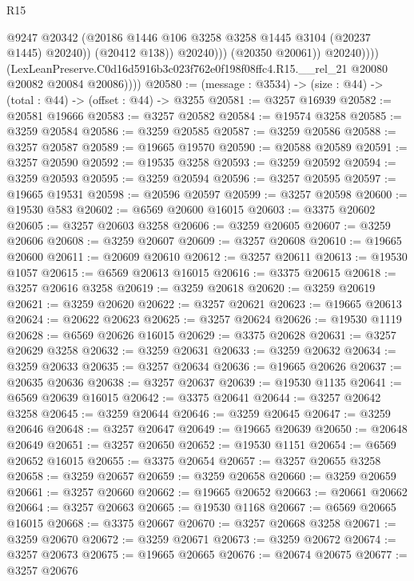\begin{lexlean}{R15}
\begin{coremodule}
                              @9247
                              @20342
                              (@20186 @1446 @106 @3258 @3258 @1445 @3104 (@20237 @1445) @20240))
                            (@20412 @138))
                          @20240)))
                    (@20350 @20061))
                  @20240))))
          (LexLeanPreserve.C0d16d5916b3c023f762e0f198f08ffc4.R15.__rel_21
            @20080
            @20082
            @20084
            @20086))))
@20580 := (message : @3534) -> (size : @44) -> (total : @44) -> (offset : @44) -> @3255
@20581 := @3257 @16939
@20582 := @20581 @19666
@20583 := @3257 @20582
@20584 := @19574 @3258
@20585 := @3259 @20584
@20586 := @3259 @20585
@20587 := @3259 @20586
@20588 := @3257 @20587
@20589 := @19665 @19570
@20590 := @20588 @20589
@20591 := @3257 @20590
@20592 := @19535 @3258
@20593 := @3259 @20592
@20594 := @3259 @20593
@20595 := @3259 @20594
@20596 := @3257 @20595
@20597 := @19665 @19531
@20598 := @20596 @20597
@20599 := @3257 @20598
@20600 := @19530 @583
@20602 := @6569 @20600 @16015
@20603 := @3375 @20602
@20605 := @3257 @20603 @3258
@20606 := @3259 @20605
@20607 := @3259 @20606
@20608 := @3259 @20607
@20609 := @3257 @20608
@20610 := @19665 @20600
@20611 := @20609 @20610
@20612 := @3257 @20611
@20613 := @19530 @1057
@20615 := @6569 @20613 @16015
@20616 := @3375 @20615
@20618 := @3257 @20616 @3258
@20619 := @3259 @20618
@20620 := @3259 @20619
@20621 := @3259 @20620
@20622 := @3257 @20621
@20623 := @19665 @20613
@20624 := @20622 @20623
@20625 := @3257 @20624
@20626 := @19530 @1119
@20628 := @6569 @20626 @16015
@20629 := @3375 @20628
@20631 := @3257 @20629 @3258
@20632 := @3259 @20631
@20633 := @3259 @20632
@20634 := @3259 @20633
@20635 := @3257 @20634
@20636 := @19665 @20626
@20637 := @20635 @20636
@20638 := @3257 @20637
@20639 := @19530 @1135
@20641 := @6569 @20639 @16015
@20642 := @3375 @20641
@20644 := @3257 @20642 @3258
@20645 := @3259 @20644
@20646 := @3259 @20645
@20647 := @3259 @20646
@20648 := @3257 @20647
@20649 := @19665 @20639
@20650 := @20648 @20649
@20651 := @3257 @20650
@20652 := @19530 @1151
@20654 := @6569 @20652 @16015
@20655 := @3375 @20654
@20657 := @3257 @20655 @3258
@20658 := @3259 @20657
@20659 := @3259 @20658
@20660 := @3259 @20659
@20661 := @3257 @20660
@20662 := @19665 @20652
@20663 := @20661 @20662
@20664 := @3257 @20663
@20665 := @19530 @1168
@20667 := @6569 @20665 @16015
@20668 := @3375 @20667
@20670 := @3257 @20668 @3258
@20671 := @3259 @20670
@20672 := @3259 @20671
@20673 := @3259 @20672
@20674 := @3257 @20673
@20675 := @19665 @20665
@20676 := @20674 @20675
@20677 := @3257 @20676

\end{coremodule}
\end{lexlean}
